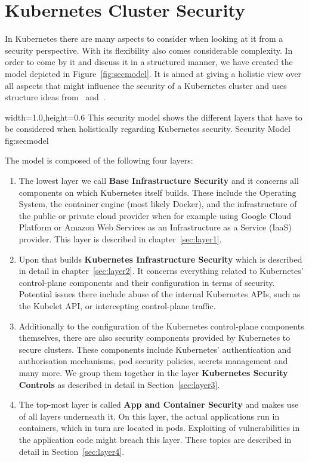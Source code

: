 \chapter{Kubernetes Cluster Security}

In Kubernetes there are many aspects to consider when looking at it from a security perspective. With its flexibility also comes considerable complexity. In order to come by it and discuss it in a structured manner, we have created the model depicted in Figure~\ref{fig:secmodel}. It is aimed at giving a holistic view over all aspects that might influence the security of a Kubernetes cluster and uses structure ideas from~\textcite{securingkubernetes} and~\textcite{kubernetessecurity}.

  {width=1.0\textwidth,height=0.6\textheight}%
  {This security model shows the different layers that have to be considered when holistically regarding Kubernetes security.}%
  {Security Model}%
  {fig:secmodel}%

The model is composed of the following four layers:

\begin{enumerate}
    \item The lowest layer we call \textbf{Base Infrastructure Security} and it concerns all components on which Kubernetes itself builds. These include the Operating System, the container engine (most likely Docker), and the infrastructure of the public or private cloud provider when for example using Google Cloud Platform or Amazon Web Services as an Infrastructure as a Service (IaaS) provider. This layer is described in chapter~\ref{sec:layer1}.
    \item Upon that builds \textbf{Kubernetes Infrastructure Security} which is described in detail in chapter~\ref{sec:layer2}. It concerns everything related to Kubernetes' control-plane components and their configuration in terms of security. Potential issues there include abuse of the internal Kubernetes APIs, such as the Kubelet API, or intercepting control-plane traffic.
    \item Additionally to the configuration of the Kubernetes control-plane components themselves, there are also security components provided by Kubernetes to secure clusters. These components include Kubernetes' authentication and authorisation mechanisms, pod security policies, secrets management and many more. We group them together in the layer \textbf{Kubernetes Security Controls} as described in detail in Section~\ref{sec:layer3}.
    \item The top-most layer is called \textbf{App and Container Security} and makes use of all layers underneath it. On this layer, the actual applications run in containers, which in turn are located in pods. Exploiting of vulnerabilities in the application code might breach this layer. These topics are described in detail in Section~\ref{sec:layer4}.
\end{enumerate}

